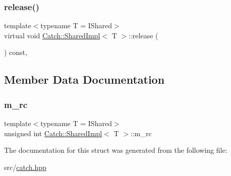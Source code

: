 \mbox{\label{struct_catch_1_1_shared_impl_ada8052c6f24fd73ec099333626f106fe}} 
\subsubsection{\texorpdfstring{release()}{release()}}
{\footnotesize\ttfamily template$<$typename T = I\+Shared$>$ \\
virtual void \hyperlink{struct_catch_1_1_shared_impl}{Catch\+::\+Shared\+Impl}$<$ T $>$\+::release (\begin{DoxyParamCaption}{ }\end{DoxyParamCaption}) const\hspace{0.3cm}{\ttfamily [inline]}, {\ttfamily [virtual]}}



\subsection{Member Data Documentation}
\mbox{\label{struct_catch_1_1_shared_impl_a7e71ef1985b85aa41a1632f932a96bcb}} 
\subsubsection{\texorpdfstring{m\+\_\+rc}{m\_rc}}
{\footnotesize\ttfamily template$<$typename T = I\+Shared$>$ \\
unsigned int \hyperlink{struct_catch_1_1_shared_impl}{Catch\+::\+Shared\+Impl}$<$ T $>$\+::m\+\_\+rc\hspace{0.3cm}{\ttfamily [mutable]}}



The documentation for this struct was generated from the following file\+:\begin{DoxyCompactItemize}
\item 
src/\hyperlink{catch_8hpp}{catch.\+hpp}\end{DoxyCompactItemize}
